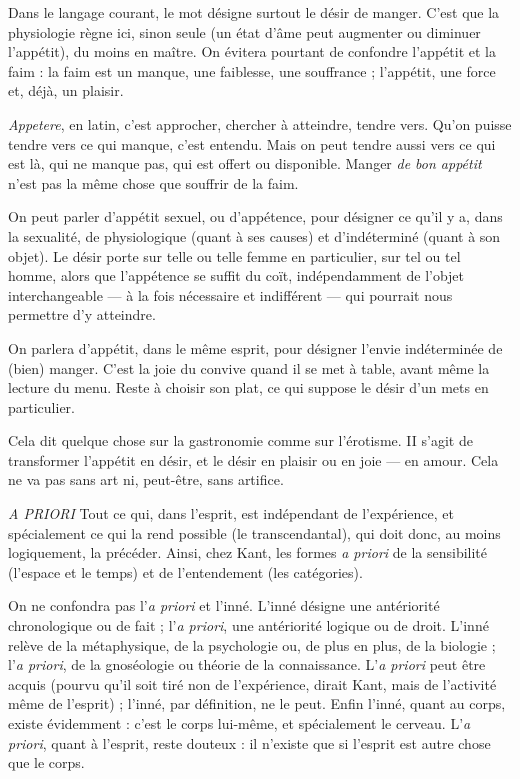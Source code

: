 Dans le langage courant, le mot désigne surtout le désir de manger. C’est
que la physiologie règne ici, sinon seule (un état d’âme peut augmenter ou
diminuer l’appétit), du moins en maître. On évitera pourtant de confondre
l'appétit et la faim : la faim est un manque, une faiblesse, une souffrance ;
l'appétit, une force et, déjà, un plaisir.

{\it Appetere}, en latin, c’est approcher, chercher à atteindre, tendre vers. Qu’on
puisse tendre vers ce qui manque, c’est entendu. Mais on peut tendre aussi vers
ce qui est là, qui ne manque pas, qui est offert ou disponible. Manger {\it de bon
appétit} n’est pas la même chose que souffrir de la faim.

On peut parler d’appétit sexuel, ou d’appétence, pour désigner ce qu’il y a,
dans la sexualité, de physiologique (quant à ses causes) et d’indéterminé (quant
à son objet). Le désir porte sur telle ou telle femme en particulier, sur tel ou tel
homme, alors que l’appétence se suffit du coït, indépendamment de l’objet
interchangeable — à la fois nécessaire et indifférent — qui pourrait nous permettre
d’y atteindre.

On parlera d’appétit, dans le même esprit, pour désigner l’envie indéterminée
de (bien) manger. C’est la joie du convive quand il se met à table, avant
même la lecture du menu. Reste à choisir son plat, ce qui suppose le désir d’un
mets en particulier.

Cela dit quelque chose sur la gastronomie comme sur l'érotisme. II s’agit de
transformer l’appétit en désir, et le désir en plaisir ou en joie — en amour. Cela
ne va pas sans art ni, peut-être, sans artifice.

{\it A PRIORI} Tout ce qui, dans l'esprit, est indépendant de l’expérience, et spécialement
ce qui la rend possible (le transcendantal), qui doit
donc, au moins logiquement, la précéder. Ainsi, chez Kant, les formes {\it a priori}
de la sensibilité (l’espace et le temps) et de l’entendement (les catégories).

On ne confondra pas l’{\it a priori} et l’inné. L’inné désigne une antériorité
chronologique ou de fait ; l’{\it a priori}, une antériorité logique ou de droit. L’inné
relève de la métaphysique, de la psychologie ou, de plus en plus, de la biologie ;
l’{\it a priori}, de la gnoséologie ou théorie de la connaissance. L’{\it a priori} peut être
acquis (pourvu qu’il soit tiré non de l’expérience, dirait Kant, mais de l’activité
même de l'esprit) ; l’inné, par définition, ne le peut. Enfin l’inné, quant au
corps, existe évidemment : c’est le corps lui-même, et spécialement le cerveau.
L’{\it a priori}, quant à l'esprit, reste douteux : il n’existe que si l’esprit est autre
chose que le corps.

